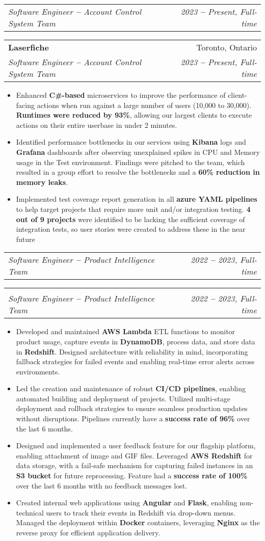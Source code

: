 \documentclass[letterpaper,10pt]{article}
\makeatletter
\newcommand{\resumeItem}[1]{
  \item\small{
    {#1 \vspace{-2pt}}
  }
}
\newcommand{\resumeSubheading}[4]{
  \vspace{-2pt}\item
    \ifthenelse{\equal{#1}{}}
    {
    \begin{tabular*}{0.97\textwidth}[t]{l@{\extracolsep{\fill}}r}
      \textit{\small#3} & \textit{\small #4} \\
    \end{tabular*}\vspace{-7pt}
    }
    {
    \begin{tabular*}{0.97\textwidth}[t]{l@{\extracolsep{\fill}}r}
      \textbf{#1} & #2 \\
      \textit{\small#3} & \textit{\small #4} \\
    \end{tabular*}\vspace{-7pt}
    }
}
\newcommand{\resumeItemListStart}{\begin{itemize}}
\newcommand{\resumeItemListEnd}{\end{itemize}\vspace{-5pt}}
\makeatother
\begin{document}
    \resumeSubheading
      {Laserfiche}{Toronto, Ontario}
      {Software Engineer \textbf{--} Account Control System Team}{2023 \textbf{--} Present, Full-time}
        \resumeItemListStart
            \resumeItem{Enhanced \textbf{C\#-based} microservices to improve
            the performance of client-facing actions when run against a large
            number of users (10,000 to 30,000). \textbf{Runtimes were reduced
            by 93\%}, allowing our largest clients to execute actions on their
            entire userbase in under 2 minutes.}
            \resumeItem{Identified performance bottlenecks in our services
            using \textbf{Kibana} logs and \textbf{Grafana} dashboards after
            observing unexplained spikes in CPU and Memory usage in the Test
            environment. Findings were pitched to the team, which resulted in a
            group effort to resolve the bottlenecks and a \textbf{60\%
            reduction in memory leaks}.}
            \resumeItem{Implemented test coverage report generation in all
            \textbf{azure YAML pipelines} to help target projects that require
            more unit and/or integration testing. \textbf{4 out of 9 projects}
            were identified to be lacking the sufficient coverage of
            integration tests, so user stories were created to address these in
            the near
            future}
        \resumeItemListEnd

    \resumeSubheading
      {}{}
      {Software Engineer \textbf{--} Product Intelligence Team}{2022 \textbf{--} 2023, Full-time}
        \resumeItemListStart
            \resumeItem{Developed and maintained \textbf{AWS Lambda} ETL
            functions to monitor product usage, capture events in
            \textbf{DynamoDB}, process data, and store data in
            \textbf{Redshift}. Designed architecture with reliability in mind,
            incorporating fallback strategies for failed events and enabling
            real-time error alerts across environments.}
            \resumeItem{Led the creation and maintenance of robust
            \textbf{CI/CD pipelines}, enabling automated building and
            deployment of projects. Utilized multi-stage deployment and
            rollback strategies to ensure seamless production updates without
            disruptions. Pipelines currently have a \textbf{success rate of
            96\%} over the last 6 months.}
            \resumeItem{Designed and implemented a user feedback feature for
            our flagship platform, enabling attachment of image and GIF files.
            Leveraged \textbf{AWS Redshift} for data storage, with a fail-safe
            mechanism for capturing failed instances in an \textbf{S3 bucket}
            for future reprocessing. Feature had a \textbf{success rate of
            100\%} over the last 6 months with no feedback messages lost.}
            \resumeItem{Created internal web applications using
            \textbf{Angular} and \textbf{Flask}, enabling non-technical users
            to track their events in Redshift via drop-down menus. Managed the
            deployment within \textbf{Docker} containers, leveraging
            \textbf{Nginx} as the reverse proxy for efficient application
            delivery.}
        \resumeItemListEnd
\end{document}
